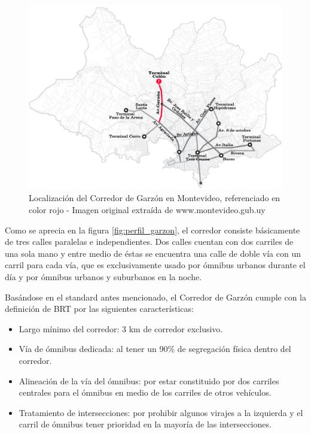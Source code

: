 \begin{figure}[H]
	\centering
	\includegraphics[width=0.99\linewidth]{Figures/Mapa_Garzon_0}
	\caption[Localización del Corredor de Garzón en Montevideo]{Localización del Corredor de Garzón en Montevideo, referenciado en color rojo - Imagen original extraída de www.montevideo.gub.uy		
	}
	\label{fig:Grafica de costos de otros medios de transporte}
\end{figure}

Como se aprecia en la figura \ref{fig:perfil_garzon}, el corredor consiste básicamente de tres calles paralelas e independientes. Dos calles cuentan con dos carriles de una sola mano y entre medio de éstas se encuentra una calle de doble vía con un carril para cada vía, que es exclusivamente usado por ómnibus urbanos durante el día y por ómnibus urbanos y suburbanos en la noche.

Basándose en el standard antes mencionado, el Corredor de Garzón cumple con la definición de BRT por las siguientes características:
\begin{itemize}
	\item Largo mínimo del corredor: 3 km de corredor exclusivo.
	\item Vía de ómnibus dedicada: al tener un 90\% de segregación física dentro del corredor.
	\item Alineación de la vía del ómnibus: por estar constituido por dos carriles centrales para el ómnibus en medio de los carriles de otros vehículos.
	\item Tratamiento de intersecciones: por prohibir algunos virajes a la izquierda y el carril de ómnibus tener prioridad en la mayoría de las intersecciones.
\end{itemize}


